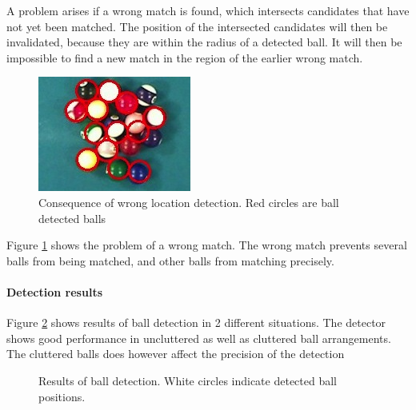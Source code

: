 A problem arises if a wrong match is found, which intersects candidates that have not yet been matched. The position of the intersected candidates will then be invalidated, because they are within the radius of a detected ball. It will then be impossible to find a new match in the region of the earlier wrong match. 
\begin{figure}[H]
\begin{center}
\includegraphics{images/wronglocate.jpg}
\caption{Consequence of wrong location detection. Red circles are ball detected balls}
\label{fig:wronglocate}
\end{center}
\end{figure}
Figure \ref{fig:wronglocate} shows the problem of a wrong match. The wrong match prevents several balls from being matched, and other balls from matching precisely.

\paragraph{Detection results}
Figure \ref{fig:detect} shows results of ball detection in 2 different situations. The detector shows good performance in uncluttered as well as cluttered ball arrangements. The cluttered balls does however affect the precision of the detection

\begin{figure}[H]
  \centering
  \quad           
   \caption{Results of ball detection. White circles indicate detected ball positions.}
  \label{fig:detect}
\end{figure}

